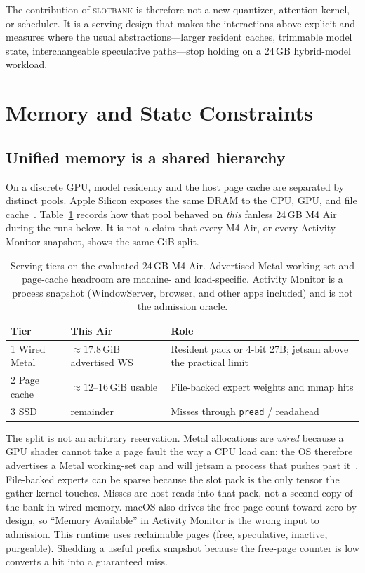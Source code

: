 \documentclass[11pt]{article}
\theoremstyle{definition}
\newcommand{\slotbank}{\textsc{slotbank}}
\begin{document}
The contribution of \slotbank{} is therefore not a new quantizer, attention kernel, or scheduler. It is a serving design that makes the interactions above explicit and measures where the usual abstractions---larger resident caches, trimmable model state, interchangeable speculative paths---stop holding on a 24\,GB hybrid-model workload.

\section{Memory and State Constraints}
\label{sec:bg}

\subsection{Unified memory is a shared hierarchy}
\label{sec:tiers}

On a discrete GPU, model residency and the host page cache are separated by distinct pools. Apple Silicon exposes the same DRAM to the CPU, GPU, and file cache~\citep{appleum,applemetalws}. Table~\ref{tab:tiers} records how that pool behaved on \emph{this} fanless 24\,GB M4 Air during the runs below. It is not a claim that every M4 Air, or every Activity Monitor snapshot, shows the same GiB split.

\begin{table}[t]
\centering
\caption{Serving tiers on the evaluated 24\,GB M4 Air. Advertised Metal working set and page-cache headroom are machine- and load-specific. Activity Monitor is a process snapshot (WindowServer, browser, and other apps included) and is not the admission oracle.}
\label{tab:tiers}
\small
\begin{tabular}{@{}lll@{}}
\toprule
Tier & This Air & Role \\
\midrule
1 Wired Metal & ${\approx}17.8$\,GiB advertised WS & Resident pack or 4-bit 27B; jetsam above the practical limit \\
2 Page cache & ${\approx}12$--16\,GiB usable & File-backed expert weights and mmap hits \\
3 SSD & remainder & Misses through \texttt{pread} / readahead \\
\bottomrule
\end{tabular}
\end{table}

The split is not an arbitrary reservation. Metal allocations are \emph{wired} because a GPU shader cannot take a page fault the way a CPU load can; the OS therefore advertises a Metal working-set cap and will jetsam a process that pushes past it~\citep{applejetsam,applemetalws}. File-backed experts can be sparse because the slot pack is the only tensor the gather kernel touches. Misses are host reads into that pack, not a second copy of the bank in wired memory. macOS also drives the free-page count toward zero by design, so ``Memory Available'' in Activity Monitor is the wrong input to admission. This runtime uses reclaimable pages (free, speculative, inactive, purgeable). Shedding a useful prefix snapshot because the free-page counter is low converts a hit into a guaranteed miss.
\end{document}
